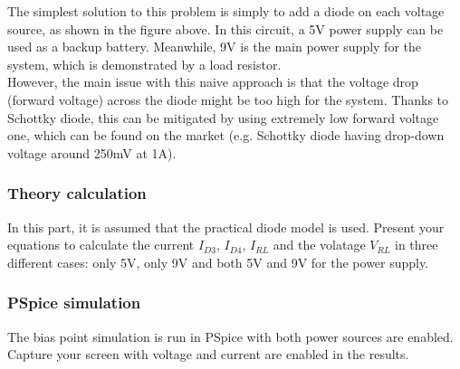 The simplest solution to this problem is simply to add a diode on each voltage source, as shown in the figure above. In this circuit, a 5V power supply can be used as a backup battery. Meanwhile, 9V is the main power supply for the system, which is demonstrated by a load resistor.\\

However, the main issue with this naive approach is that the voltage drop (forward voltage) across the diode might be too high for the system. Thanks to Schottky diode, this can be mitigated by using extremely low forward voltage one, which can be found on the market (e.g. Schottky diode having drop-down voltage around 250mV at 1A).

\subsubsection{Theory calculation}
In this part, it is assumed that the practical diode model is used. Present your equations to calculate the current $I_{D3}$, $I_{D4}$, $I_{RL}$ and the volatage $V_{RL}$ in three different cases: only 5V, only 9V and both 5V and 9V for the power supply.\\

\dotfill\bigskip\par\mbox{}\dotfill
\dotfill\bigskip\par\mbox{}\dotfill
\dotfill\bigskip\par\mbox{}\dotfill
\dotfill\bigskip\par\mbox{}\dotfill

\subsubsection{PSpice simulation}
The bias point simulation is run in PSpice with both power sources are enabled. Capture your screen with voltage and current are enabled in the results.\\

